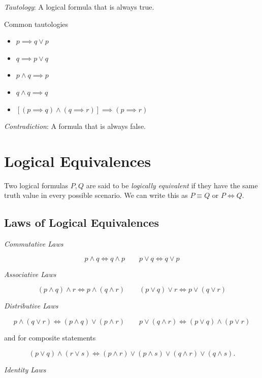 \emph{Tautology}: A logical formula that is always true.

Common tautologies

\begin{itemize}

	\item \(p \implies q \lor p\)

	\item \(q \implies p \lor q\)

	\item \(p \land q \implies p\)

	\item \(q \land q \implies q \)

	\item \([(p \implies q) \land (q \implies r)] \implies  (p \implies r)\)

\end{itemize}

\emph{Contradiction}: A formula that is always false.

\section{Logical Equivalences}

Two logical formulas \(P, Q\) are said to be \emph{logically equivalent} if they have the same truth value in every possible scenario.
We can write this as \(P \equiv Q\) or \(P \iff Q\).

\subsection{Laws of Logical Equivalences}

\emph{Commutative Laws}

\[
	p \land q \iff q \land p \qquad p \lor q \iff q \lor p
\]

\emph{Associative Laws}

\[
	(p \land q) \land r \iff p \land (q \land r) \qquad (p \lor q) \lor r \iff p \lor (q \lor r)
\]

\emph{Distributive Laws}

\[
	p \land (q \lor r) \iff (p \land q) \lor (p \land r) \qquad
	p \lor (q \land r) \iff (p \lor q) \land (p \lor r)
\]

and for composite statements

\[
	(p \lor q) \land (r \lor s)  \iff (p \land r) \lor (p \land s) \lor (q \land  r) \lor (q \land s).
\]

\emph{Identity Laws}


